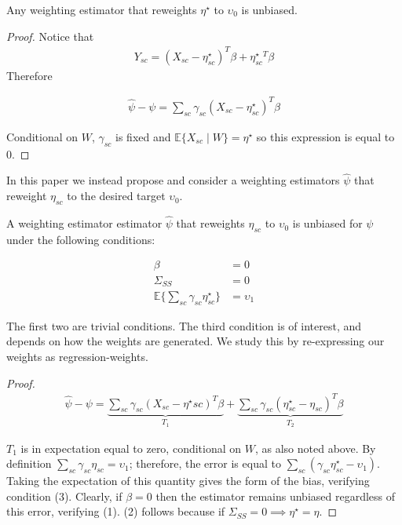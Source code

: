 \begin{proposition}
    Any weighting estimator that reweights $\eta^\star$ to $\upsilon_0$ is unbiased.
\end{proposition}

\begin{proof}
    Notice that 
    \begin{align*}
        Y_{sc} = (X_{sc} - \eta^\star_{sc})^T\beta + \eta^\star_{sc}^T\beta
    \end{align*}
    Therefore
    
    \begin{align*}
        \hat{\psi} - \psi = \sum_{sc}\gamma_{sc}(X_{sc} - \eta^\star_{sc})^T\beta
    \end{align*}
    
    Conditional on $W$, $\gamma_{sc}$ is fixed and $\mathbb{E}\{X_{sc} \mid W\} = \eta^\star$ so this expression is equal to 0.
\end{proof}

In this paper we instead propose and consider a weighting estimators $\hat{\psi}$ that reweight $\eta_{sc}$ to the desired target $\upsilon_0$.

\begin{proposition}

A weighting estimator estimator $\hat{\psi}$ that reweights $\eta_{sc}$ to $\upsilon_0$ is unbiased for $\psi$ under the following conditions:

\begin{align}
    \beta &= 0 \\
    \Sigma_{SS} &= 0 \\
    \mathbb{E}\{\sum_{sc}\gamma_{sc}\eta^\star_{sc}\} &= \upsilon_1
\end{align}
\end{proposition}

The first two are trivial conditions. The third condition is of interest, and depends on how the weights are generated. We study this by re-expressing our weights as regression-weights.

\begin{proof}
    \begin{align*}
    \hat{\psi} - \psi = \underbrace{\sum_{sc}\gamma_{sc}(X_{sc} - \eta^\star{sc})^T\beta}_{T_1} + \underbrace{\sum_{sc}\gamma_{sc}(\eta^\star_{sc} - \eta_{sc})^T\beta}
    _{T_2}
    \end{align*}
    
    $T_1$ is in expectation equal to zero, conditional on $W$, as also noted above. By definition $\sum_{sc}\gamma_{sc}\eta_{sc} = \upsilon_1$; therefore, the error is equal to $\sum_{sc}(\gamma_{sc}\eta^\star_{sc} - \upsilon_1)$. Taking the expectation of this quantity gives the form of the bias, verifying condition (3). Clearly, if $\beta = 0$ then the estimator remains unbiased regardless of this error, verifying (1). (2) follows because if $\Sigma_{SS} = 0 \implies \eta^\star = \eta$.
\end{proof}

